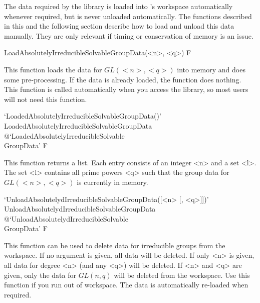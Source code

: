 The data required by the {\IRREDSOL} library is loaded into {\GAP}'s workspace automatically whenever required, but is never unloaded automatically. The functions described in this
and the following section describe how to load and unload this data manually. 
They are only relevant if timing or conservation of memory is an issue.

\>LoadAbsolutelyIrreducibleSolvableGroupData(<n>, <q>) F

This function loads the data for $GL(<n>, <q>)$ into memory and does some pre-processing. If the data
is already loaded, the function does nothing. This function is called automatically when you access the
{\IRREDSOL} library, so most users  will not need this function.

\>`LoadedAbsolutelyIrreducibleSolvableGroupData()'%
{LoadedAbsolutelyIrreducibleSolvableGroupData}%
@{`LoadedAbsolutelyIrreducibleSolvable\\GroupData'} F

This function returns a list. Each entry consists of an integer <n> and a set <l>. The set
<l> contains all prime powers <q> such that the group data for $GL(<n>, <q>)$ is currently in memory.

\>`UnloadAbsolutelydIrreducibleSolvableGroupData([<n> [, <q>]])'%
{UnloadAbsolutelydIrreducibleSolvableGroupData}%
@{`UnloadAbsolutelydIrreducibleSolvable\\GroupData'} F

This function can be used to delete data for irreducible groups from the {\GAP} workspace. If no argument
is given, all data will be deleted. If only <n> is given, all data for degree <n> (and any <q>) will
be deleted. If <n> and <q> are given, only the data for $GL(n, q)$ will be deleted from the {\GAP}
workspace. Use this function if you run out of {\GAP} workspace. The
data is automatically re-loaded when required.


